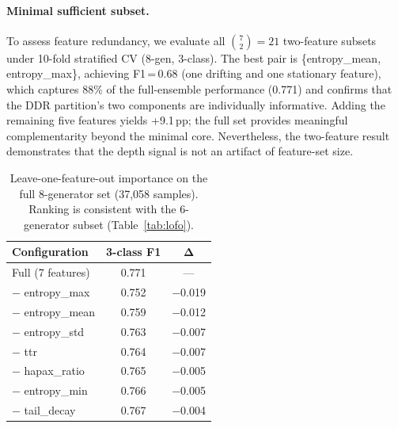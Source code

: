 \paragraph{Minimal sufficient subset.}
 To assess feature redundancy, we evaluate all $\binom{7}{2}{=}21$ two-feature subsets under 10-fold stratified CV (8-gen, 3-class).
The best pair is \{entropy\_mean, entropy\_max\}, achieving F1\,=\,0.68 (one drifting and one stationary feature), which captures 88\% of the full-ensemble performance (0.771) and confirms that the DDR partition's two components are individually informative.
Adding the remaining five features yields +9.1\,pp; the full set provides meaningful complementarity beyond the minimal core. Nevertheless, the two-feature result demonstrates that the depth signal is not an artifact of feature-set size.

\begin{table}[ht]
\centering
\small
\caption{Leave-one-feature-out importance on the full 8-generator set (37,058 samples). Ranking is consistent with the 6-generator subset (Table~\ref{tab:lofo}).}
\label{tab:lofo-8gen}
\begin{tabular}{lcc}
\toprule
\textbf{Configuration} & \textbf{3-class F1} & $\boldsymbol{\Delta}$ \\
\midrule
Full (7 features) & 0.771 & --- \\
\midrule
$-$ entropy\_max    & 0.752 & $-$0.019 \\
$-$ entropy\_mean   & 0.759 & $-$0.012 \\
$-$ entropy\_std    & 0.763 & $-$0.007 \\
$-$ ttr             & 0.764 & $-$0.007 \\
$-$ hapax\_ratio    & 0.765 & $-$0.005 \\
$-$ entropy\_min    & 0.766 & $-$0.005 \\
$-$ tail\_decay     & 0.767 & $-$0.004 \\
\bottomrule
\end{tabular}
\end{table}
